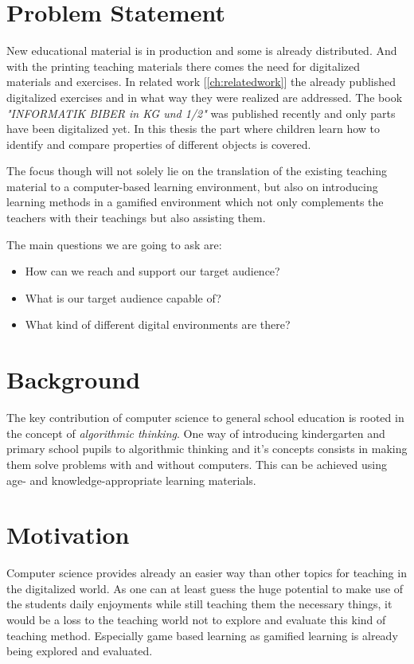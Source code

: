\section{Problem Statement}\label{sec:problem-statement}
New educational material is in production and some is already distributed.
And with the printing teaching materials there comes the need for digitalized materials and exercises.
In related work [\ref{ch:relatedwork}] the already published digitalized exercises and
in what way they were realized are addressed.
The book \textit{"INFORMATIK BIBER in KG und 1/2"} was published recently and only parts have been digitalized yet.
In this thesis the part where children learn how to identify and compare properties of different objects is covered.

The focus though will not solely lie on the translation of the existing teaching material to a
computer-based learning environment, but also on introducing learning methods in a gamified environment which
not only complements the teachers with their teachings but also assisting them.

The main questions we are going to ask are:

\begin{itemize}
    \item How can we reach and support our target audience?
    \item What is our target audience capable of?
    \item What kind of different digital environments are there?
\end{itemize}

\section{Background}\label{sec:background}
The key contribution of computer science to general school education is rooted in the concept of
\textit{algorithmic thinking}\cite{HKKS17}.
One way of introducing kindergarten and primary school pupils to algorithmic thinking and
it's concepts consists in making them solve problems with and without computers.
This can be achieved using age- and knowledge-appropriate learning materials.

\section{Motivation}\label{sec:motivation}
Computer science provides already an easier way than other topics for teaching in the digitalized world.
As one can at least guess the huge potential to make use of the students daily enjoyments while still teaching
them the necessary things, it would be a loss to the teaching world not to explore and evaluate this kind of teaching
method. Especially game based learning as gamified learning is already being explored and evaluated.

